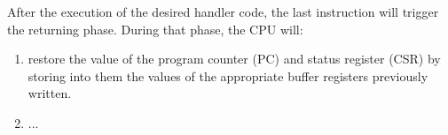 \documentclass{article}
\begin{document}
        After the execution of the desired handler code, the last instruction will trigger the returning phase. During that phase, the CPU will:

        \begin{enumerate}

            \item restore the value of the program counter (PC) and status register (CSR) by storing into them the values of the appropriate buffer registers previously written.
            \item ...

        \end{enumerate}

    \clearpage
\end{document}
